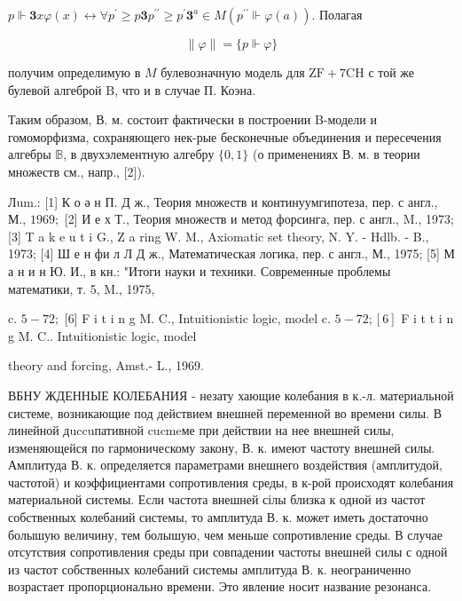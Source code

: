 \documentclass[10pt]{article}
\begin{document}
$p \Vdash \mathbf{3} x \varphi(x) \longleftrightarrow \forall p^{\prime} \geqslant p \mathbf{3} p^{\prime \prime} \geqslant p^{\prime} \mathbf{3}^{a} \in M\left(p^{\prime \prime} \Vdash \varphi(a)\right)$. Полагая



\[

\|\varphi\|=\{p \Vdash \varphi\}

\]



получим определимую в $M$ булевозначную модель для $\mathrm{ZF}+7 \mathrm{CH}$ с той же булевой алгеброй $\mathrm{B}$, что и в случае П. Коэна.



Таким образом, В. м. состоит фактически в построении B-модели и гомоморфизма, сохраняющего нек-рые бесконечные объединения и пересечения алгебры $\mathbb{B}$, в двухэлементную алгебру $\{0,1\}$ (о применениях В. м. в теории множеств см., напр., [2]).



Лum.: [1] К о ә н П. Д ж., Теория множеств и континуумгипотеза, пер. с англ., М., $1969 ;$ [2] И е х Т., Теория множеств и метод форсинга, пер. с англ., M., 1973; [3] T a k e u t i G., Z a ring W. M., Axiomatic set theory, N. Y. - Hdlb. - B., 1973; [4] Ш е н фи л Л Д ж., Математическая логика, пер. с англ., М., 1975; [5] М а н и н Ю. И., в кн.: "Итоги науки и техники. Современные проблемы математики, т. 5, M., 1975,

c. $5-72 ;$ [6] F i t i n g M. C., Intuitionistic logic, model c. $5-72 ;[6]$ F i t t i n g M. C.. Intuitionistic logic, model

theory and forcing, Amst.- L., 1969.



ВБНУ ЖДЕННЫЕ КОЛЕБАНИЯ - незату хающие колебания в к.-л. материальной системе, возникающие под действием внешней переменной во времени силы. В линейной дuccuпативной cucmeме при действии на нее внешней силы, изменяющейся по гармоническому закону, В. к. имеют частоту внешней силы. Амплитуда В. к. определяется параметрами внешнего воздействия (амплитудой, частотой) и коэффициентами сопротивления среды, в к-рой происходят колебания материальной системы. Если частота внешней сілы близка к одной из частот собственных колебаний системы, то амплитуда В. к. может иметь достаточно болышую величину, тем болышую, чем меньше сопротивление среды. В случае отсутствия сопротивления среды при совпадении частоты внешней силы с одной из частот собственных колебаний системы амплитуда В. к. неограниченно возрастает пропорционально времени. Это явление носит название резонанса.
\end{document}
